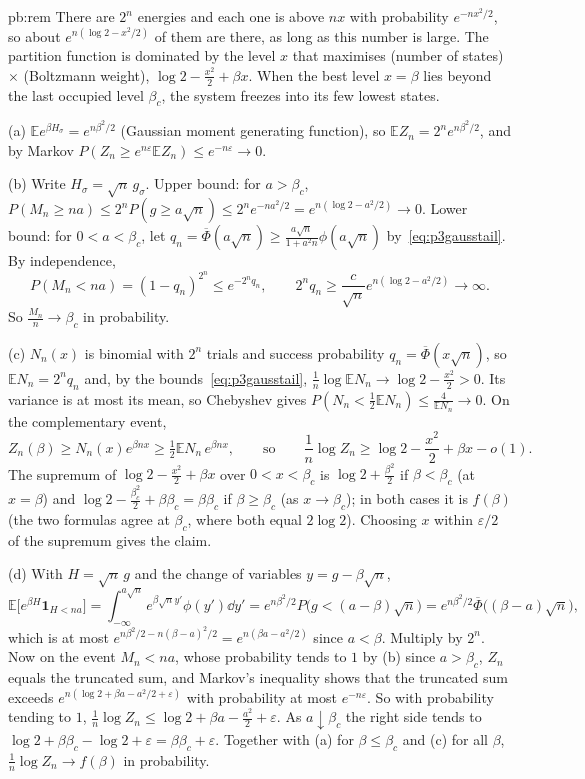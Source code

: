 \begin{solution}{pb:rem}
\idea There are $2^n$ energies and each one is above $nx$ with probability $e^{-nx^2/2}$, so about $e^{n(\log2-x^2/2)}$ of them are there, as long as this number is large.
The partition function is dominated by the level $x$ that maximises (number of states) $\times$ (Boltzmann weight), $\log2-\frac{x^2}2+\beta x$. When the best level $x=\beta$
lies beyond the last occupied level $\beta_c$, the system freezes into its few lowest states.

\writeup (a) $\mathbb Ee^{\beta H_\sigma}=e^{n\beta^2/2}$ (Gaussian moment generating function), so $\mathbb EZ_n=2^ne^{n\beta^2/2}$, and by Markov
$P(Z_n\ge e^{n\varepsilon}\mathbb EZ_n)\le e^{-n\varepsilon}\to0$.

(b) Write $H_\sigma=\sqrt n\,g_\sigma$. Upper bound: for $a>\beta_c$, $P(M_n\ge na)\le2^nP(g\ge a\sqrt n)\le2^ne^{-na^2/2}=e^{n(\log2-a^2/2)}\to0$. Lower bound: for $0<a<\beta_c$,
let $q_n=\overline\Phi(a\sqrt n)\ge\frac{a\sqrt n}{1+a^2n}\phi(a\sqrt n)$ by~\eqref{eq:p3gausstail}. By independence,
\[
P(M_n<na)=(1-q_n)^{2^n}\le e^{-2^nq_n},\qquad 2^nq_n\ge\frac{c}{\sqrt n}e^{n(\log2-a^2/2)}\to\infty.
\]
So $\frac{M_n}n\to\beta_c$ in probability.

(c) $N_n(x)$ is binomial with $2^n$ trials and success probability $q_n=\overline\Phi(x\sqrt n)$, so $\mathbb EN_n=2^nq_n$ and, by the bounds~\eqref{eq:p3gausstail},
$\frac1n\log\mathbb EN_n\to\log2-\frac{x^2}2>0$. Its variance is at most its mean, so Chebyshev gives $P(N_n<\frac12\mathbb EN_n)\le\frac4{\mathbb EN_n}\to0$. On the complementary
event,
\[
Z_n(\beta)\ge N_n(x)e^{\beta nx}\ge\tfrac12\mathbb EN_n\,e^{\beta nx},\qquad\text{so}\qquad\frac1n\log Z_n\ge\log2-\frac{x^2}2+\beta x-o(1).
\]
The supremum of $\log2-\frac{x^2}2+\beta x$ over $0<x<\beta_c$ is $\log2+\frac{\beta^2}2$ if $\beta<\beta_c$ (at $x=\beta$) and $\log2-\frac{\beta_c^2}2+\beta\beta_c=\beta\beta_c$ if
$\beta\ge\beta_c$ (as $x\to\beta_c$); in both cases it is $f(\beta)$ (the two formulas agree at $\beta_c$, where both equal $2\log 2$). Choosing $x$ within $\varepsilon/2$ of the
supremum gives the claim.

(d) With $H=\sqrt n\,g$ and the change of variables $y=g-\beta\sqrt n$,
\[
\mathbb E\bigl[e^{\beta H}\mathbf 1_{H<na}\bigr]=\int_{-\infty}^{a\sqrt n}e^{\beta\sqrt n y'}\phi(y')\dd y'=e^{n\beta^2/2}P\bigl(g<(a-\beta)\sqrt n\bigr)=e^{n\beta^2/2}\overline\Phi\bigl((\beta-a)\sqrt n\bigr),
\]
which is at most $e^{n\beta^2/2-n(\beta-a)^2/2}=e^{n(\beta a-a^2/2)}$ since $a<\beta$. Multiply by $2^n$. Now on the event $M_n<na$, whose probability tends to $1$ by (b) since
$a>\beta_c$, $Z_n$ equals the truncated sum, and Markov's inequality shows that the truncated sum exceeds $e^{n(\log2+\beta a-a^2/2+\varepsilon)}$ with probability at most
$e^{-n\varepsilon}$. So with probability tending to $1$, $\frac1n\log Z_n\le\log2+\beta a-\frac{a^2}2+\varepsilon$. As $a\downarrow\beta_c$ the right side tends to
$\log2+\beta\beta_c-\log2+\varepsilon=\beta\beta_c+\varepsilon$. Together with (a) for $\beta\le\beta_c$ and (c) for all $\beta$, $\frac1n\log Z_n\to f(\beta)$ in probability.


\end{solution}
